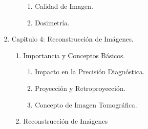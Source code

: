 \begin{enumerate}
\begin{enumerate}
        \begin{enumerate}
            \item Calidad de Imagen.
            \item Dosimetría.
        \end{enumerate}
    \end{enumerate}
    \item Capitulo 4: Reconstrucción de Imágenes.
    \begin{enumerate}
        \item Importancia y Conceptos Básicos.
        \begin{enumerate}
            \item Impacto en la Precisión Diagnóstica.
            \item Proyección y Retroproyección.
            \item Concepto de Imagen Tomográfica.
        \end{enumerate}
        \item Reconstrucción de Imágenes
    \end{enumerate}
\end{enumerate}
